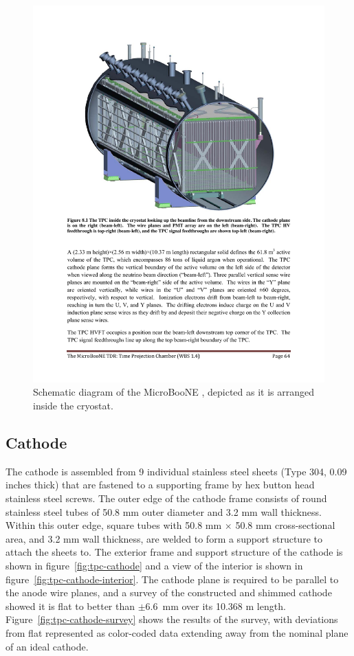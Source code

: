 \begin{figure}[htb]
\centering	
\includegraphics[width=0.8\linewidth]{figures/cryo_tpc.pdf}
\caption{Schematic diagram of the MicroBooNE \lartpc, depicted as it is arranged inside the cryostat.}
\label{fig:tpc-cryostat}
\end{figure}


%
\subsection{Cathode}
The cathode is assembled from 9 individual stainless steel sheets (Type 304, 0.09 inches thick) that are fastened to a supporting frame by hex button head stainless steel screws. The outer edge of the cathode frame consists of round stainless steel tubes of 50.8 mm outer diameter and 3.2 mm wall thickness.  Within this outer edge, square tubes with 50.8 mm $\times$ 50.8 mm cross-sectional area, and 3.2 mm wall thickness, are welded to form a support structure to attach the sheets to.  The exterior frame and support structure of the cathode is shown in figure~\ref{fig:tpc-cathode} and a view of the interior is shown in figure~\ref{fig:tpc-cathode-interior}. The cathode plane is required to be parallel to the anode wire planes, and a survey of the constructed and shimmed cathode showed it is flat to better than $\pm$6.6~mm over its 10.368 m length.  Figure~\ref{fig:tpc-cathode-survey} shows the results of the survey, with deviations from flat represented as color-coded data extending away from the nominal plane of an ideal cathode. %

